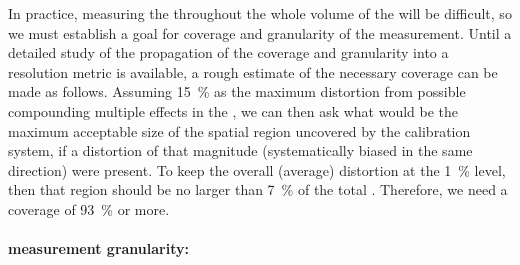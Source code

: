 In practice, measuring the \efield  throughout the whole volume
of the  will be difficult, 
so we must establish a goal for coverage and granularity of the measurement. 
Until a detailed study of the propagation of the coverage and granularity into a resolution metric is available, 
a rough estimate of the necessary coverage can be made as follows.
Assuming \SI{15}{\%} as the maximum \efield distortion from possible compounding multiple  effects in the  ,
we can then ask what would be the maximum acceptable size of the spatial region uncovered by the calibration system, if a distortion of that magnitude (systematically biased in the same direction) were present. To keep the overall (average) \efield distortion at the \SI{1}{\%} level, then that region should be no larger than \SI{7}{\%} of the total . Therefore, we need a coverage of \SI{93}{\%} or more.

\paragraph{\efield measurement granularity:}

